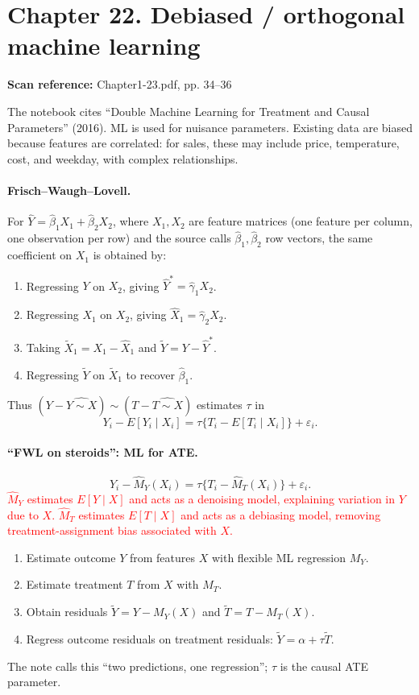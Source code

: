 \documentclass[11pt,a4paper]{article}
\newcommand{\sourcepages}[1]{\par{\small\sffamily\color{muted}\textbf{Scan reference:} #1\par}\nobreak\smallskip\nopagebreak[4]}
\newcommand{\inkred}[1]{\textcolor{red}{#1}}
\begin{document}
{\section{Chapter 22. Debiased / orthogonal machine learning}
\sourcepages{Chapter1-23.pdf, pp. 34--36}
The notebook cites ``Double Machine Learning for Treatment and Causal Parameters'' (2016). ML is used for nuisance parameters. Existing data are biased because features are correlated: for sales, these may include price, temperature, cost, and weekday, with complex relationships.

\paragraph{Frisch--Waugh--Lovell.}
For $\hat Y=\hat\beta_1X_1+\hat\beta_2X_2$, where $X_1,X_2$ are feature matrices (one feature per column, one observation per row) and the source calls $\hat\beta_1,\hat\beta_2$ row vectors, the same coefficient on $X_1$ is obtained by:
\begin{enumerate}
\item Regressing $Y$ on $X_2$, giving $\hat Y^*=\hat\gamma_1X_2$.
\item Regressing $X_1$ on $X_2$, giving $\hat X_1=\hat\gamma_2X_2$.
\item Taking $\widetilde X_1=X_1-\hat X_1$ and $\widetilde Y=Y-\hat Y^*$.
\item Regressing $\widetilde Y$ on $\widetilde X_1$ to recover $\hat\beta_1$.
\end{enumerate}
Thus $(Y-\widehat{Y\sim X})\sim(T-\widehat{T\sim X})$ estimates $\tau$ in
\[Y_i-E[Y_i\mid X_i]=\tau\{T_i-E[T_i\mid X_i]\}+\varepsilon_i.\]

\paragraph{``FWL on steroids'': ML for ATE.}
\[Y_i-\hat M_Y(X_i)=\tau\{T_i-\hat M_T(X_i)\}+\varepsilon_i.\]
\inkred{$\hat M_Y$ estimates $E[Y\mid X]$ and acts as a denoising model, explaining variation in $Y$ due to $X$.} \inkred{$\hat M_T$ estimates $E[T\mid X]$ and acts as a debiasing model, removing treatment-assignment bias associated with $X$.}
\begin{enumerate}
\item Estimate outcome $Y$ from features $X$ with flexible ML regression $M_Y$.
\item Estimate treatment $T$ from $X$ with $M_T$.
\item Obtain residuals $\widetilde Y=Y-M_Y(X)$ and $\widetilde T=T-M_T(X)$.
\item Regress outcome residuals on treatment residuals: $\widetilde Y=\alpha+\tau\widetilde T$.
\end{enumerate}
The note calls this ``two predictions, one regression''; $\tau$ is the causal ATE parameter.

}
\end{document}
